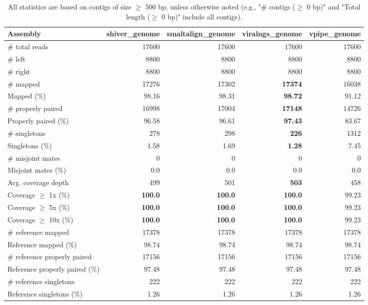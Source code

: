 \documentclass[12pt,a4paper]{article}
\begin{document}
\begin{table}[ht]
\begin{center}
\caption{All statistics are based on contigs of size $\geq$ 500 bp, unless otherwise noted (e.g., "\# contigs ($\geq$ 0 bp)" and "Total length ($\geq$ 0 bp)" include all contigs).}
\begin{tabular}{|l*{4}{|r}|}
\hline
Assembly & shiver\_genome & smaltalign\_genome & viralngs\_genome & vpipe\_genome \\ \hline
\# total reads & 17600 & 17600 & 17600 & 17600 \\ \hline
\# left & 8800 & 8800 & 8800 & 8800 \\ \hline
\# right & 8800 & 8800 & 8800 & 8800 \\ \hline
\# mapped & 17276 & 17302 & {\bf 17374} & 16038 \\ \hline
Mapped (\%) & 98.16 & 98.31 & {\bf 98.72} & 91.12 \\ \hline
\# properly paired & 16998 & 17004 & {\bf 17148} & 14726 \\ \hline
Properly paired (\%) & 96.58 & 96.61 & {\bf 97.43} & 83.67 \\ \hline
\# singletons & 278 & 298 & {\bf 226} & 1312 \\ \hline
Singletons (\%) & 1.58 & 1.69 & {\bf 1.28} & 7.45 \\ \hline
\# misjoint mates & 0 & 0 & 0 & 0 \\ \hline
Misjoint mates (\%) & 0.0 & 0.0 & 0.0 & 0.0 \\ \hline
Avg. coverage depth & 499 & 501 & {\bf 503} & 458 \\ \hline
Coverage $\geq$ 1x (\%) & {\bf 100.0} & {\bf 100.0} & {\bf 100.0} & 99.23 \\ \hline
Coverage $\geq$ 5x (\%) & {\bf 100.0} & {\bf 100.0} & {\bf 100.0} & 99.23 \\ \hline
Coverage $\geq$ 10x (\%) & {\bf 100.0} & {\bf 100.0} & {\bf 100.0} & 99.23 \\ \hline
\# reference mapped & 17378 & 17378 & 17378 & 17378 \\ \hline
Reference mapped (\%) & 98.74 & 98.74 & 98.74 & 98.74 \\ \hline
\# reference properly paired & 17156 & 17156 & 17156 & 17156 \\ \hline
Reference properly paired (\%) & 97.48 & 97.48 & 97.48 & 97.48 \\ \hline
\# reference singletons & 222 & 222 & 222 & 222 \\ \hline
Reference singletons (\%) & 1.26 & 1.26 & 1.26 & 1.26 \\ \hline

\end{tabular}
\end{center}
\end{table}
\end{document}
